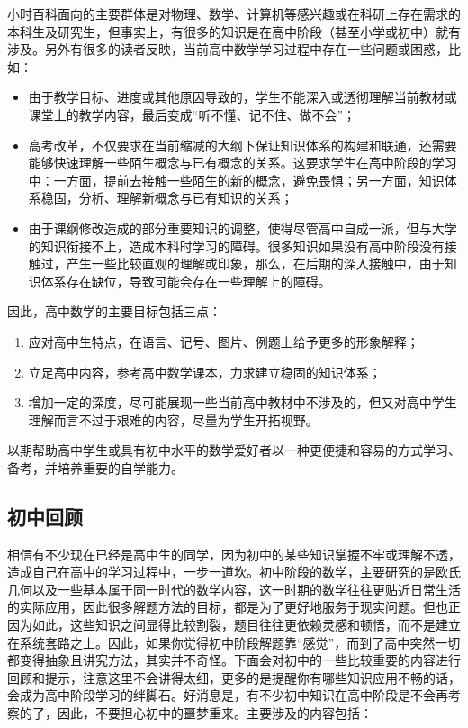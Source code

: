 
\begin{issues}
\issueDraft
\end{issues}

小时百科面向的主要群体是对物理、数学、计算机等感兴趣或在科研上存在需求的本科生及研究生，但事实上，有很多的知识是在高中阶段（甚至小学或初中）就有涉及。另外有很多的读者反映，当前高中数学学习过程中存在一些问题或困惑，比如：
\begin{itemize}
\item 由于教学目标、进度或其他原因导致的，学生不能深入或透彻理解当前教材或课堂上的教学内容，最后变成“听不懂、记不住、做不会”；
\item 高考改革，不仅要求在当前缩减的大纲下保证知识体系的构建和联通，还需要能够快速理解一些陌生概念与已有概念的关系。这要求学生在高中阶段的学习中：一方面，提前去接触一些陌生的新的概念，避免畏惧；另一方面，知识体系稳固，分析、理解新概念与已有知识的关系；
\item 由于课纲修改造成的部分重要知识的调整，使得尽管高中自成一派，但与大学的知识衔接不上，造成本科时学习的障碍。很多知识如果没有高中阶段没有接触过，产生一些比较直观的理解或印象，那么，在后期的深入接触中，由于知识体系存在缺位，导致可能会存在一些理解上的障碍。
\end{itemize}

因此，高中数学的主要目标包括三点：
\begin{enumerate}
\item 应对高中生特点，在语言、记号、图片、例题上给予更多的形象解释；
\item 立足高中内容，参考高中数学课本，力求建立稳固的知识体系；
\item 增加一定的深度，尽可能展现一些当前高中教材中不涉及的，但又对高中学生理解而言不过于艰难的内容，尽量为学生开拓视野。
\end{enumerate}
以期帮助高中学生或具有初中水平的数学爱好者以一种更便捷和容易的方式学习、备考，并培养重要的自学能力。

\subsection{初中回顾}

相信有不少现在已经是高中生的同学，因为初中的某些知识掌握不牢或理解不透，造成自己在高中的学习过程中，一步一道坎。初中阶段的数学，主要研究的是欧氏几何以及一些基本属于同一时代的数学内容，这一时期的数学往往更贴近日常生活的实际应用，因此很多解题方法的目标，都是为了更好地服务于现实问题。但也正因为如此，这些知识之间显得比较割裂，题目往往更依赖灵感和顿悟，而不是建立在系统套路之上。因此，如果你觉得初中阶段解题靠“感觉”，而到了高中突然一切都变得抽象且讲究方法，其实并不奇怪。下面会对初中的一些比较重要的内容进行回顾和提示，注意这里不会讲得太细，更多的是提醒你有哪些知识应用不畅的话，会成为高中阶段学习的绊脚石。好消息是，有不少初中知识在高中阶段是不会再考察的了，因此，不要担心初中的噩梦重来。主要涉及的内容包括：

